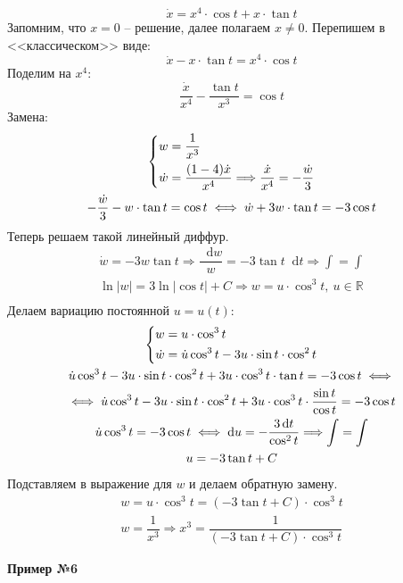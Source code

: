\documentclass[a4paper,12pt]{article}
\newcommand{\R}{\mathbb{R}}
\renewcommand*\d{\mathop{}\!\mathrm{d}}
\newcommand{\dw}{\dot{w}}
\newcommand{\du}{\dot{u}}
\newcommand{\dx}{\dot{x}}
\newcommand{\ds}{\displaystyle}
\begin{document}
\[\dx = x^4\cdot \cos t + x \cdot \tan t\]
Запомним, что $x = 0$ -- решение, далее полагаем $x \neq 0$. Перепишем в <<классическом>> виде:
\[\dx - x \cdot \tan t = x^4 \cdot \cos t\]
Поделим на $x^4$:
\[\dfrac{\dx}{x^4} - \dfrac{\tan t}{x^3} = \cos t\]
Замена:
\begin{gather*}
\left\{\begin{gathered}
w = \dfrac{1}{x^3}\hfill\\
\dw = \dfrac{(1 - 4)\dx}{x^4} \Longrightarrow \dfrac{\dx}{x^4} = -\dfrac{\dw}{3}\hfill
\end{gathered}\right.\\
-\dfrac{\dw}{3} - w \cdot \tan t = \cos t \iff \dw + 3w \cdot \tan t = -3\cos t
\end{gather*}
Теперь решаем такой линейный диффур.
\begin{gather*}
\dw = -3w\tan t \Longrightarrow \dfrac{\d w}{w} = -3 \tan t \d t \Longrightarrow \ds\int = \int \\
\ln|w| = 3\ln|\cos t| + C \Longrightarrow w = u \cdot \cos^3t,\ u \in \R\\
\end{gather*}
Делаем вариацию постоянной $u = u(t)$:
\begin{gather*}
\left\{\begin{gathered}
w = u \cdot \cos^3t\hfill\\
\dw = \du\cos^3t - 3u \cdot \sin t \cdot \cos^2 t\hfill
\end{gathered}\right.\\
\du\cos^3t - 3u \cdot \sin t \cdot \cos^2 t + 3u \cdot \cos^3t \cdot \tan t = -3\cos t \iff\\
\iff  \du\cos^3t - 3u \cdot \sin t \cdot \cos^2 t + 3u \cdot \cos^3t \cdot \dfrac{\sin t}{\cos t}= -3\cos t\\
\du \cos^3 t = -3\cos t \iff \d u = -\dfrac{3\d t}{\cos^2 t} \Longrightarrow \ds\int = \int \\
u = -3 \tan t + C
\end{gather*}
Подставляем в выражение для $w$ и делаем обратную замену.
\begin{gather*}
w = u \cdot \cos^3t = \left(-3 \tan t + C\right)\cdot \cos^3t\\
w = \dfrac{1}{x^3} \Longrightarrow x^3 = \dfrac{1}{\left(-3\tan t + C\right)\cdot \cos^3 t}
\end{gather*}

\textbf{Пример №6}
\end{document}
